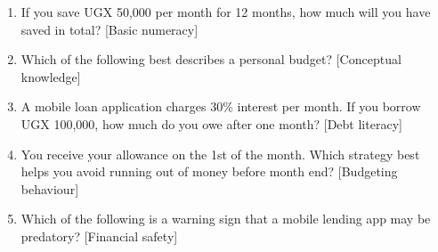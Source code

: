 \documentclass[12pt]{report}
\begin{document}
\begin{appendices}
\begin{enumerate}
    \item If you save UGX 50,000 per month for 12 months, how much will you have saved in total? [Basic numeracy]
    \item Which of the following best describes a personal budget? [Conceptual knowledge]
    \item A mobile loan application charges 30\% interest per month. If you borrow UGX 100,000, how much do you owe after one month? [Debt literacy]
    \item You receive your allowance on the 1st of the month. Which strategy best helps you avoid running out of money before month end? [Budgeting behaviour]
    \item Which of the following is a warning sign that a mobile lending app may be predatory? [Financial safety]
\end{enumerate}
\end{appendices}
\end{document}
